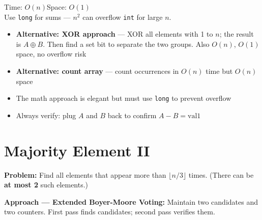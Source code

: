 \documentclass[12pt,a4paper,oneside]{book}
\begin{document}
\begin{complexity}
Time: $O(n)$\quad Space: $O(1)$\\[4pt]
Use \texttt{long} for sums --- $n^2$ can overflow \texttt{int} for large $n$.
\end{complexity}

\begin{interviewcorner}
\begin{itemize}
  \item \textbf{Alternative: XOR approach} --- XOR all elements with 1 to $n$; the result is $A \oplus B$. Then find a set bit to separate the two groups. Also $O(n)$, $O(1)$ space, no overflow risk
  \item \textbf{Alternative: count array} --- count occurrences in $O(n)$ time but $O(n)$ space
  \item The math approach is elegant but must use \texttt{long} to prevent overflow
  \item Always verify: plug $A$ and $B$ back to confirm $A - B = \text{val1}$
\end{itemize}
\end{interviewcorner}

\section{Majority Element II}

\textbf{Problem:} Find all elements that appear more than $\lfloor n/3 \rfloor$ times. (There can be \textbf{at most 2} such elements.)

\textbf{Approach --- Extended Boyer-Moore Voting:} Maintain two candidates and two counters. First pass finds candidates; second pass verifies them.
\end{document}
